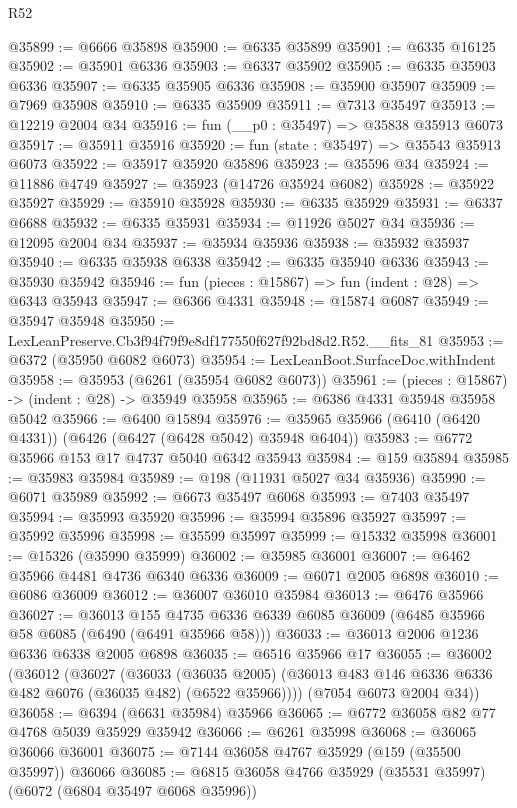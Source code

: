 \begin{lexlean}{R52}
\begin{coremodule}
@35899 := @6666 @35898
@35900 := @6335 @35899
@35901 := @6335 @16125
@35902 := @35901 @6336
@35903 := @6337 @35902
@35905 := @6335 @35903 @6336
@35907 := @6335 @35905 @6336
@35908 := @35900 @35907
@35909 := @7969 @35908
@35910 := @6335 @35909
@35911 := @7313 @35497
@35913 := @12219 @2004 @34
@35916 := fun (__p0 : @35497) => @35838 @35913 @6073
@35917 := @35911 @35916
@35920 := fun (state : @35497) => @35543 @35913 @6073
@35922 := @35917 @35920 @35896
@35923 := @35596 @34
@35924 := @11886 @4749
@35927 := @35923 (@14726 @35924 @6082)
@35928 := @35922 @35927
@35929 := @35910 @35928
@35930 := @6335 @35929
@35931 := @6337 @6688
@35932 := @6335 @35931
@35934 := @11926 @5027 @34
@35936 := @12095 @2004 @34
@35937 := @35934 @35936
@35938 := @35932 @35937
@35940 := @6335 @35938 @6338
@35942 := @6335 @35940 @6336
@35943 := @35930 @35942
@35946 := fun (pieces : @15867) => fun (indent : @28) => @6343 @35943
@35947 := @6366 @4331
@35948 := @15874 @6087
@35949 := @35947 @35948
@35950 := LexLeanPreserve.Cb3f94f79f9e8df177550f627f92bd8d2.R52.__fits_81
@35953 := @6372 (@35950 @6082 @6073)
@35954 := LexLeanBoot.SurfaceDoc.withIndent
@35958 := @35953 (@6261 (@35954 @6082 @6073))
@35961 := (pieces : @15867) -> (indent : @28) -> @35949 @35958
@35965 := @6386 @4331 @35948 @35958 @5042
@35966 := @6400 @15894
@35976 := @35965 @35966 (@6410 (@6420 @4331)) (@6426 (@6427 (@6428 @5042) @35948 @6404))
@35983 := @6772 @35966 @153 @17 @4737 @5040 @6342 @35943
@35984 := @159 @35894
@35985 := @35983 @35984
@35989 := @198 (@11931 @5027 @34 @35936)
@35990 := @6071 @35989
@35992 := @6673 @35497 @6068
@35993 := @7403 @35497
@35994 := @35993 @35920
@35996 := @35994 @35896 @35927
@35997 := @35992 @35996
@35998 := @35599 @35997
@35999 := @15332 @35998
@36001 := @15326 (@35990 @35999)
@36002 := @35985 @36001
@36007 := @6462 @35966 @4481 @4736 @6340 @6336
@36009 := @6071 @2005 @6898
@36010 := @6086 @36009
@36012 := @36007 @36010 @35984
@36013 := @6476 @35966
@36027 := @36013
    @155
    @4735
    @6336
    @6339
    @6085
    @36009
    (@6485 @35966 @58 @6085 (@6490 (@6491 @35966 @58)))
@36033 := @36013 @2006 @1236 @6336 @6338 @2005 @6898
@36035 := @6516 @35966 @17
@36055 := @36002
    (@36012
      (@36027
        (@36033
          (@36035 @2005)
          (@36013 @483 @146 @6336 @6336 @482 @6076 (@36035 @482) (@6522 @35966))))
      (@7054 @6073 @2004 @34))
@36058 := @6394 (@6631 @35984) @35966
@36065 := @6772 @36058 @82 @77 @4768 @5039 @35929 @35942
@36066 := @6261 @35998
@36068 := @36065 @36066 @36001
@36075 := @7144 @36058 @4767 @35929 (@159 (@35500 @35997)) @36066
@36085 := @6815 @36058 @4766 @35929 (@35531 @35997) (@6072 (@6804 @35497 @6068 @35996))

\end{coremodule}
\end{lexlean}
